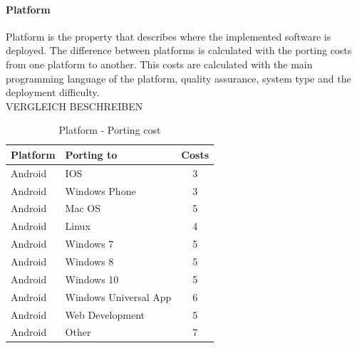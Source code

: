 \paragraph*{\textbf{Platform}}
Platform is the property that describes where the implemented software is deployed. The difference between platforms is calculated with the porting costs from one platform to another. This costs are calculated with the main programming language of the platform, quality assurance, system type and the deployment difficulty.\\
VERGLEICH BESCHREIBEN
\begin{table}[h]
	\centering 
	\setlength{\tabcolsep}{4pt}
	\begin{tabular}{|l|l|c|}\hline
		Platform			& Porting to 	&  Costs 	\\ \hline
		Android   			& IOS					& 3      		\\ \hline
		Android   			& Windows Phone 		& 3      		\\ \hline
		Android   			& Mac OS 				& 5     		\\ \hline
		Android   			& Linux 				& 4     		\\ \hline
		Android  			& Windows 7 			& 5     		\\ \hline
		Android  			& Windows 8				& 5     		\\ \hline
		Android  			& Windows 10 			& 5     		\\ \hline
		Android  			& Windows Universal App	& 6     		\\ \hline
		Android  			& Web Development 		& 5     		\\ \hline
		Android  			& Other 				& 7     		\\ \hline
	\end{tabular} 
	\caption{Platform - Porting cost} 
	\label{property:platform} 
\end{table}\newpage

